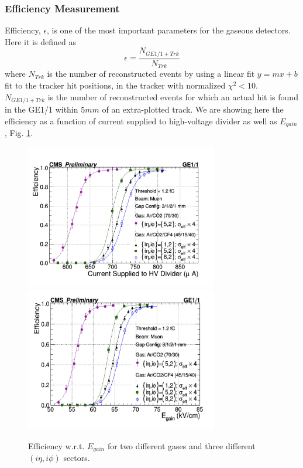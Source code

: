 \subsubsection{Efficiency Measurement}
Efficiency, $\epsilon$, is one of the most important parameters for the gaseous detectors. Here it is defined as 
\begin{equation}
\epsilon = \frac{N_{GE1/1+Trk}}{N_{Trk}}
\end{equation}
where $N_{Trk}$ is the number of reconstructed events by using a linear fit $y = mx + b$ fit to the tracker hit positions, in the tracker with normalized $\chi^2<10$.
$N_{GE1/1+Trk}$ is the number of reconstructed events for which an actual hit is found in the GE1/1 within $5mm$ of an extra-plotted track.
We are showing here the efficiency as a function of current supplied to high-voltage divider as well as $E_{gain}$, Fig. \ref{Efficiency}. 
\begin{figure}[!htbp]
\centering
\includegraphics[width=0.75\textwidth]{figures/GEM/Efficiency_Current.jpeg}\\
\includegraphics[width=0.75\textwidth]{figures/GEM/Efficiency_EGain.jpeg}
\caption{Efficiency w.r.t. $E_{gain}$ for two different gases and three different $(i\eta,i\phi)$ sectors.}
\label{Efficiency}
\end{figure}
